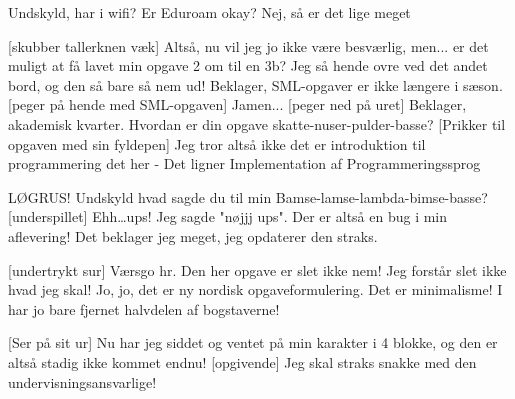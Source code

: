 \documentclass[a4paper,11pt]{article}
\begin{document}
\begin{sketch}

 Undskyld, har i wifi?
 Er Eduroam okay? %
 Nej, så er det lige meget

[skubber tallerknen væk] Altså, nu vil jeg jo ikke være besværlig, men...
er det muligt at få lavet min opgave 2 om til en 3b? Jeg så hende ovre ved det
andet bord, og den så bare så nem ud!
 Beklager, SML-opgaver er ikke længere i sæson.
[peger på hende med SML-opgaven] Jamen...
[peger ned på uret] Beklager, akademisk kvarter.
 Hvordan er din opgave skatte-nuser-pulder-basse?
[Prikker til opgaven med sin fyldepen] Jeg tror altså ikke det er introduktion til programmering det her
- Det ligner Implementation af Programmeringssprog

 LØGRUS!
 Undskyld hvad sagde du til min Bamse-lamse-lambda-bimse-basse?
[underspillet] Ehh\ldots ups! Jeg sagde "nøjjj ups".
 Der er altså en bug i min aflevering!
 Det beklager jeg meget, jeg opdaterer den straks.

[undertrykt sur] Værsgo hr.
 Den her opgave er slet ikke nem! Jeg forstår slet ikke hvad jeg skal!
 Jo, jo, det er ny nordisk opgaveformulering. Det er minimalisme!
 I har jo bare fjernet halvdelen af bogstaverne!

[Ser på sit ur] Nu har jeg siddet og ventet på min karakter i 4 blokke,
                         og den er altså stadig ikke kommet endnu!
[opgivende] Jeg skal straks snakke med den undervisningsansvarlige!




\end{sketch}
\end{document}
